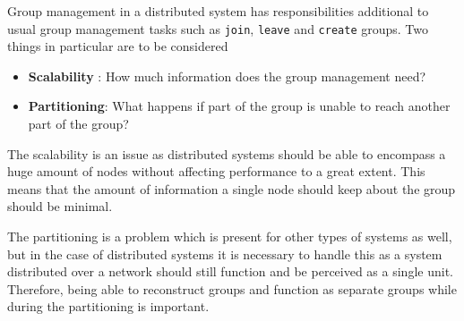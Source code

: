 	Group management in a distributed system has responsibilities additional to usual group management tasks such as \texttt{join}, \texttt{leave} and \texttt{create} groups.
	Two things in particular are to be considered
	\begin{itemize}
		\item \textbf{Scalability} : How much information does the group management need?
		\item \textbf{Partitioning}: What happens if part of the group is unable to reach another part of the group?
	\end{itemize}

	The scalability is an issue as distributed systems should be able to encompass a huge amount of nodes without affecting performance to a great extent.
	This means that the amount of information a single node should keep about the group should be minimal.

	The partitioning is a problem which is present for other types of systems as well, but in the case of distributed systems it is necessary to handle this as a system distributed over a network should still function and be perceived as a single unit.
	Therefore, being able to reconstruct groups and function as separate groups while during the partitioning is important.
